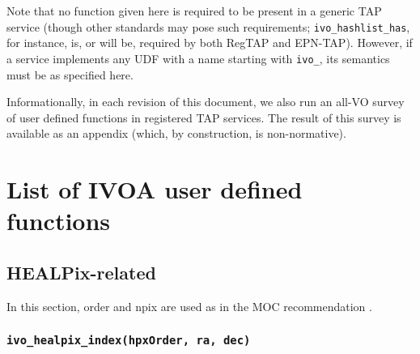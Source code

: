 \documentclass[11pt,a4paper]{ivoa}
\begin{document}
Note that no function given here is required to be present in a generic
TAP service (though other standards may pose such requirements;
\verb|ivo_hashlist_has|, for instance, is, or will be, required by both
RegTAP and EPN-TAP).  However, if a service implements any UDF with a
name starting with \verb|ivo_|, its semantics must be as specified here.

Informationally, in each revision of this document, we also run an
all-VO survey of user defined functions in registered TAP services.  The
result of this survey is available as an appendix (which, by
construction, is non-normative).







\section{List of IVOA user defined functions}
\subsection{HEALPix-related}

In this section, order and npix are used as in the MOC recommendation
\citep{2014ivoa.spec.0602F}.

\subsubsection{\texttt{ivo\_healpix\_index(hpxOrder, ra, dec)}}
\end{document}

